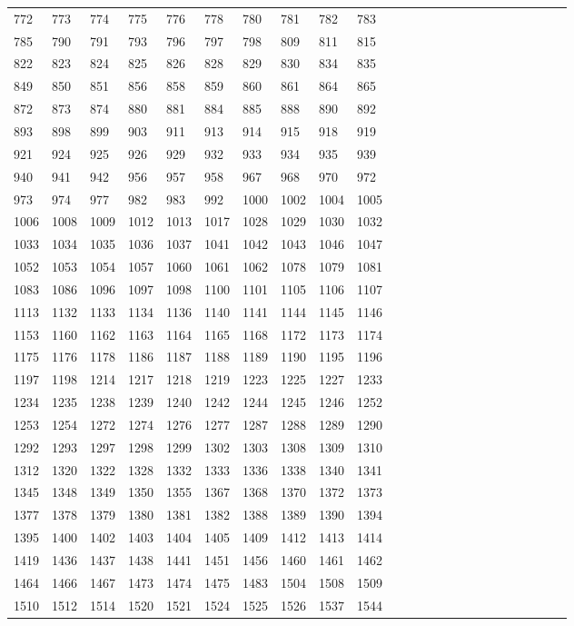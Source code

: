 \begin{longtable}{*{24}{l}}
772& 773& 774& 775& 776& 778& 780& 781& 782& 783\\
785& 790& 791& 793& 796& 797& 798& 809& 811& 815\\
822& 823& 824& 825& 826& 828& 829& 830& 834& 835\\
849& 850& 851& 856& 858& 859& 860& 861& 864& 865\\
872& 873& 874& 880& 881& 884& 885& 888& 890& 892\\
893& 898& 899& 903& 911& 913& 914& 915& 918& 919\\
921& 924& 925& 926& 929& 932& 933& 934& 935& 939\\
940& 941& 942& 956& 957& 958& 967& 968& 970& 972\\
973& 974& 977& 982& 983& 992& 1000& 1002& 1004& 1005\\
1006& 1008& 1009& 1012& 1013& 1017& 1028& 1029& 1030& 1032\\
1033& 1034& 1035& 1036& 1037& 1041& 1042& 1043& 1046& 1047\\
1052& 1053& 1054& 1057& 1060& 1061& 1062& 1078& 1079& 1081\\
1083& 1086& 1096& 1097& 1098& 1100& 1101& 1105& 1106& 1107\\
1113& 1132& 1133& 1134& 1136& 1140& 1141& 1144& 1145& 1146\\
1153& 1160& 1162& 1163& 1164& 1165& 1168& 1172& 1173& 1174\\
1175& 1176& 1178& 1186& 1187& 1188& 1189& 1190& 1195& 1196\\
1197& 1198& 1214& 1217& 1218& 1219& 1223& 1225& 1227& 1233\\
1234& 1235& 1238& 1239& 1240& 1242& 1244& 1245& 1246& 1252\\
1253& 1254& 1272& 1274& 1276& 1277& 1287& 1288& 1289& 1290\\
1292& 1293& 1297& 1298& 1299& 1302& 1303& 1308& 1309& 1310\\
1312& 1320& 1322& 1328& 1332& 1333& 1336& 1338& 1340& 1341\\
1345& 1348& 1349& 1350& 1355& 1367& 1368& 1370& 1372& 1373\\
1377& 1378& 1379& 1380& 1381& 1382& 1388& 1389& 1390& 1394\\
1395& 1400& 1402& 1403& 1404& 1405& 1409& 1412& 1413& 1414\\
1419& 1436& 1437& 1438& 1441& 1451& 1456& 1460& 1461& 1462\\
1464& 1466& 1467& 1473& 1474& 1475& 1483& 1504& 1508& 1509\\
1510& 1512& 1514& 1520& 1521& 1524& 1525& 1526& 1537& 1544\\

\end{longtable}

